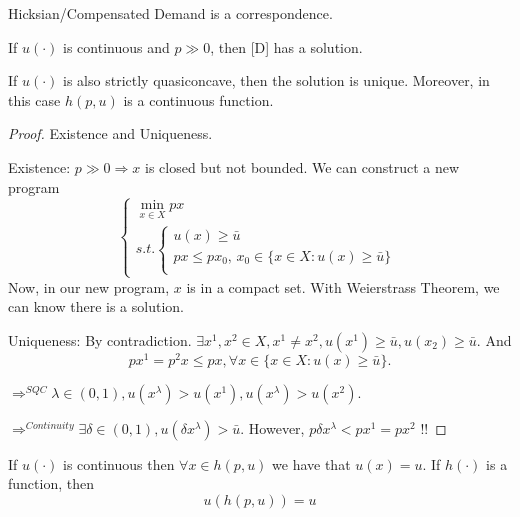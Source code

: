 \begin{remark*}
    Hicksian/Compensated Demand is a correspondence.
\end{remark*}


\begin{proposition}
    If $u(\cdot )$ is continuous and $p \gg 0$, then [D] has a solution.

    If $u(\cdot )$ is also strictly quasiconcave, then the solution is unique. Moreover, in this case $h(p,u)$ is a continuous function.
\end{proposition}

\begin{proof} Existence and Uniqueness.

    Existence: $p \gg 0 \Longrightarrow x$ is closed but not bounded. We can construct a new program \[
        \left\{\begin{array}{l}
            \min_{x \in X} px \\
            s.t. \left\{\begin{array}{l}
                            u(x) \geq \bar{u}                                        \\
                            px \leq p x_0, \, x_0 \in \{x \in X: u(x) \geq \bar{u}\} \\
                        \end{array}\right.
        \end{array}\right.
    \]
    Now, in our new program, $x$ is in a compact set. With Weierstrass Theorem, we can know there is a solution.

    Uniqueness: By contradiction. $\exists x^1, x^2 \in X, x^1 \neq x^2, u(x^1) \geq \bar{u}, u(x_2) \geq \bar{u}$. And \[
        p x^1 = p^2 x \leq px, \forall x \in \{x \in X: u(x) \geq \bar{u}\}.
    \]

    $\Longrightarrow^{SQC} \lambda \in (0,1), u(x^\lambda) > u(x^1), u(x^\lambda) > u(x^2)$.

    $\Longrightarrow^{Continuity} \exists \delta \in (0,1), u(\delta x^\lambda) > \bar{u}$. However, $p \delta x^\lambda < p x^1 = px^2$ !!
\end{proof}



\begin{proposition}
    If $u(\cdot )$ is continuous then $\forall x \in h(p,u)$ we have that $u(x) = u$. If $h(\cdot )$ is a function, then \[
        u(h(p,u)) = u
    \]
\end{proposition}

